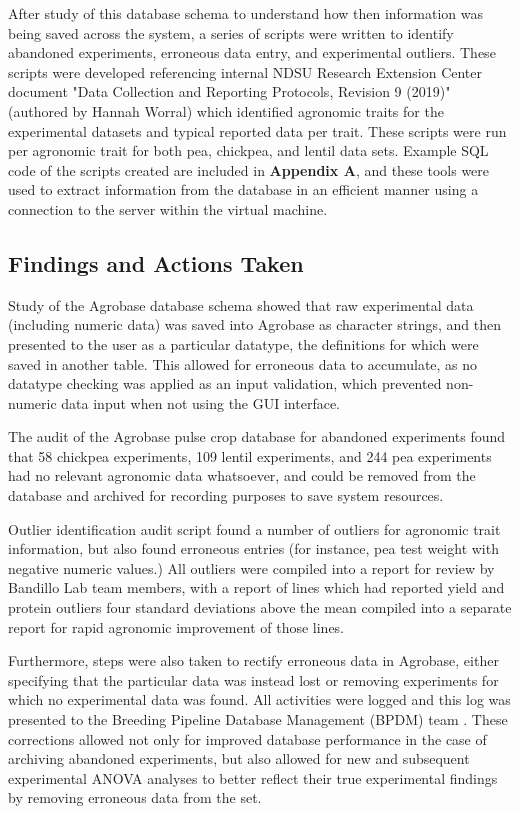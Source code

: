 \documentclass[12pt, letterpaper,oneocolumn]{article}
\begin{document}
After study of this database schema to understand how then information was being saved across the system, a series of scripts were written to identify abandoned experiments, erroneous data entry, and experimental outliers. These scripts were developed referencing internal NDSU Research Extension Center document "Data Collection and Reporting Protocols, Revision 9 (2019)" (authored by Hannah Worral) which identified agronomic traits for the experimental datasets and typical reported data per trait. These scripts were run per agronomic trait for both pea, chickpea, and lentil data sets. Example SQL code of the scripts created are included in \textbf{Appendix A}, and these tools were used to extract information from the database in an efficient manner using a connection to the server within the virtual machine.

	\subsection{Findings and Actions Taken}
	Study of the Agrobase database schema showed that raw experimental data (including numeric data) was saved into Agrobase as character strings, and then presented to the user as a particular datatype, the definitions for which were saved in another table. This allowed for erroneous data to accumulate, as no datatype checking was applied as an input validation, which prevented non-numeric data input when not using the GUI interface.

	The audit of the Agrobase pulse crop database for abandoned experiments found that 58 chickpea experiments, 109 lentil experiments, and 244 pea experiments had no relevant agronomic data whatsoever, and could be removed from the database and archived for recording purposes to save system resources.

	Outlier identification audit script found a number of outliers for agronomic trait information, but also found erroneous entries (for instance, pea test weight with negative numeric values.) All outliers were compiled into a report for review by Bandillo Lab team members, with a report of lines which had reported yield and protein outliers four standard deviations above the mean compiled into a separate report for rapid agronomic improvement of those lines.

	Furthermore, steps were also taken to rectify erroneous data in Agrobase, either specifying that the particular data was instead lost or removing experiments for which no experimental data was found. All activities were logged and this log was presented to the Breeding Pipeline Database Management (BPDM) team \cite{BPDM}. These corrections allowed not only for improved database performance in the case of archiving abandoned experiments, but also allowed for new and subsequent experimental ANOVA analyses to better reflect their true experimental findings by removing erroneous data from the set.
\end{document}
